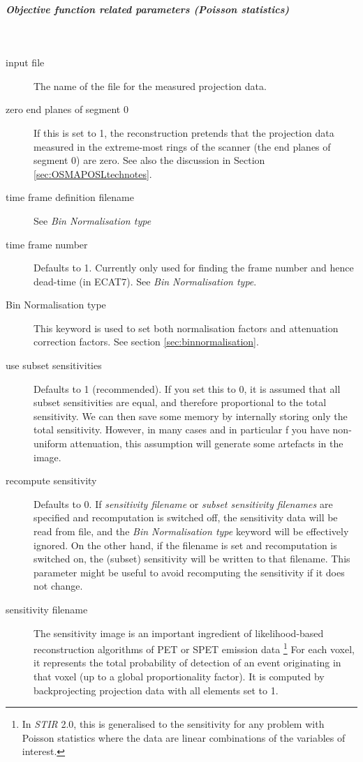 \documentclass{article}
\newcommand{\subsubsubsubsection}[1]{\subparagraph{#1} \mbox{} \\}
\begin{document}
{{ \subsubsubsubsection{Objective function related parameters (Poisson statistics)}
}
\label{sec:PoissonProjectionDataObjectiveFunction}

\begin{description}

\item[input file]
The name of the file for the measured projection data. 


\item[zero end planes of segment 0]
If this is set to 1, the reconstruction pretends that the projection 
data measured in the extreme-most rings of the scanner (the end 
planes of segment 0) are zero. See also the discussion in Section 
\ref{sec:OSMAPOSLtechnotes}.


\item[time frame definition filename]
See \textit{Bin Normalisation type}

\item[time frame number]
Defaults to 1. Currently only used for finding the frame number and hence dead-time (in ECAT7).
See \textit{Bin Normalisation type}.

\item[Bin Normalisation type]
This keyword is used to set both normalisation factors and attenuation
correction factors. See section \ref{sec:binnormalisation}.

\item[use subset sensitivities]
Defaults to 1 (recommended).
If you set this to 0, it is assumed that all subset sensitivities are equal, and therefore proportional 
to the total sensitivity. We can then save some memory by internally storing only the total sensitivity. 
However, in many cases and in particular f you have non-uniform attenuation, 
this assumption will generate some artefacts in the image.

\item[recompute sensitivity]
Defaults to 0. If \textit{sensitivity filename} or \textit{subset sensitivity filenames} 
are specified and recomputation is switched off, the sensitivity data will be read
from file, and the 
\textit{Bin Normalisation type} keyword will be effectively ignored.
On the other hand, if the filename is set and recomputation is switched on, the
(subset) sensitivity will be written to that filename. This parameter might be useful
to avoid recomputing the sensitivity if it does not change.

\item[sensitivity filename]
The sensitivity image is an important ingredient of 
likelihood-based reconstruction algorithms of PET or SPET emission data
\footnote{In \textit{STIR} 2.0, this is generalised to the sensitivity for
any problem with Poisson statistics where the data are linear
combinations of the variables of interest.}
For each voxel, it represents the total probability of detection of an 
event originating in that voxel (up to a global proportionality factor).
It is computed by backprojecting projection data with all elements set to 1.


\end{description}}
\end{document}
